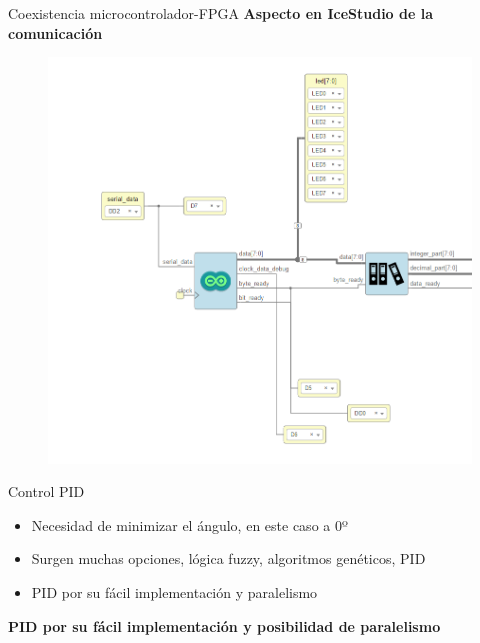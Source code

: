 \documentclass{beamer}
\begin{document}
\begin{frame}{Coexistencia microcontrolador-FPGA}
\centering \textbf{Aspecto en IceStudio de la comunicación}
\begin{figure}[H]
	\center
	\includegraphics[scale=0.3]{imagenes/Balancing_robot/arduino_arrange.PNG}
\end{figure}
\end{frame}





\begin{frame}{Control PID}
\begin{block}{}
	\begin{itemize}
		\item Necesidad de minimizar el ángulo, en este caso a 0º
		\item Surgen muchas opciones, lógica fuzzy, algoritmos genéticos, PID
		\item PID por su fácil implementación y paralelismo
	\end{itemize}
\end{block}
\begin{alertblock}
	\centering \textbf{PID por su fácil implementación y posibilidad de paralelismo}
\end{alertblock}
\end{frame}
\end{document}
